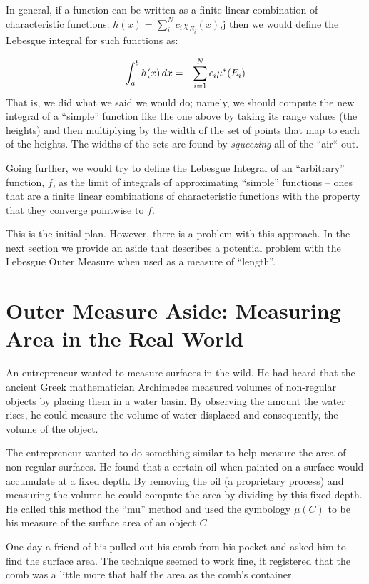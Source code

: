 \documentclass{article}
\begin{document}
In general, if a function can be written as a finite linear combination of 
characteristic functions: $h(x) = \sum_i^N c_i \chi_{E_i}(x)$,j
then we would define the Lebesgue integral for such functions as:

\begin{eqnarray}
	\int_a^b h(x) \, dx & = & \sum_{i=1}^N\limits c_i \mu^*(E_i)
\end{eqnarray}
That is, we did what we said we would do; namely, we should compute the new integral 
of a ``simple'' function like the one above by taking its range values (the heights) 
and then multiplying by the width of the set of points that map to each of the heights. 
The widths of the sets are found by {\em squeezing\/} all of the ``air`` out.

Going further, we would try to define the Lebesgue Integral of an ``arbitrary''
function, $f$, as the limit of integrals of approximating ``simple'' functions  -- ones that
are a finite linear combinations of characteristic functions with the property
that they converge pointwise to $f$.

This is the initial plan. However, there is a problem with this approach. In the next section we 
provide an aside that describes a potential problem with the Lebesgue Outer Measure when 
used as a measure of ``length''.


\section{Outer Measure Aside: Measuring Area in the Real World}
An entrepreneur 
wanted to measure surfaces in the wild. He had heard that the 
ancient Greek mathematician Archimedes measured volumes of non-regular objects 
by placing them in a water basin. By observing the amount the water rises, he 
could measure the volume of water displaced and consequently, the volume of the object.

The entrepreneur wanted to do something similar to help measure the area of 
non-regular surfaces. He found that a 
certain oil when painted on a surface would accumulate at a fixed depth. By 
removing the oil (a proprietary process) and measuring the volume he could 
compute the area by dividing by this fixed depth. He called this method the 
``mu'' method and used the symbology $\mu(C)$ to be his measure of the surface 
area of an object $C$.

One day a friend of his pulled out his comb from his pocket and asked him to 
find the surface area. The technique seemed to work fine, it registered that 
the comb was a little more that half the area as the comb's container.
\end{document}
